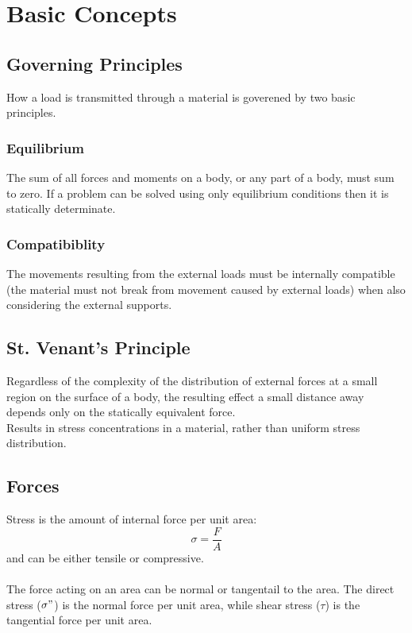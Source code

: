 \documentclass[12pt,a4paper]{article}
\begin{document}
\newpage

\section{Basic Concepts}
    \subsection{Governing Principles}
        How a load is transmitted through a material is goverened by two basic principles. 
        \subsubsection{Equilibrium}
            The sum of all forces and moments on a body, or any part of a body, must sum to zero. If a problem can be solved using only equilibrium conditions then it is statically determinate.

        \subsubsection{Compatibiblity}
            The movements resulting from the external loads must be internally compatible (the material must not break from movement caused by external loads) when also considering the external supports.

    \subsection{St. Venant's Principle}
        Regardless of the complexity of the distribution of external forces at a small region on the surface of a body, the resulting effect a small distance away depends only on the statically equivalent force. \\
        Results in stress concentrations in a material, rather than uniform stress distribution. \\

    \subsection{Forces}
        Stress is the amount of internal force per unit area:
        \[\sigma = \frac{F}{A}\]
        and can be either tensile or compressive. \\
        \\
        The force acting on an area can be normal or tangentail to the area. The direct stress ($\sigma"$) is the normal force per unit area, while shear stress ($\tau$) is the tangential force per unit area.
\end{document}
